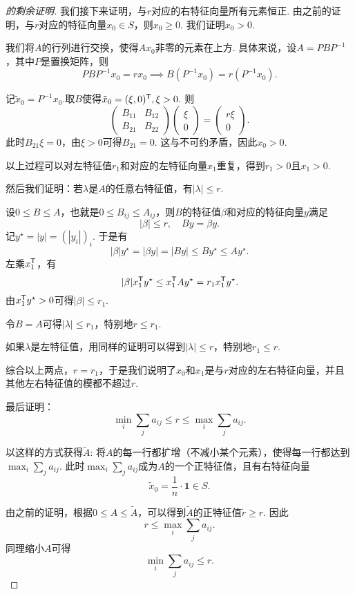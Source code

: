 \begin{proof}[ 的剩余证明]
我们接下来证明，与$r$对应的右特征向量所有元素恒正. 由之前的证明，与$r$对应的特征向量$x_0\in S$，则$x_0\geq 0$. 我们证明$x_0>0$.

我们将$A$的行列进行交换，使得$Ax_0$非零的元素在上方. 具体来说，设$A = PBP^{-1}$，其中$P$是置换矩阵，则
\[PBP^{-1}x_0=rx_0\implies B(P^{-1}x_0)=r(P^{-1}x_0).\]

记$\tilde{x}_0 = P^{-1}x_0$.取$B$使得$\tilde{x}_0 = (\xi,0)^{\mathsf{T}}, \xi > 0$. 则
\[
\begin{pmatrix}
    B_{11} & B_{12}\\
    B_{21} & B_{22}
\end{pmatrix}
\begin{pmatrix}
    \xi\\
    0
\end{pmatrix}=
\begin{pmatrix}
    r\xi\\
    0
\end{pmatrix}.
\]
此时$B_{21}\xi=0$，由$\xi>0$可得$B_{21}=0$. 这与不可约矛盾，因此$x_0 > 0$.

以上过程可以对左特征值$r_1$和对应的左特征向量$x_1$重复，得到$r_1>0$且$x_1>0$.

然后我们证明：若$\lambda$是$A$的任意右特征值，有$|\lambda|\leq r$. 

设$0\leq B\leq A$，也就是$0\leq B_{ij}\leq A_{ij}$，则$B$的特征值$\beta$和对应的特征向量$y$满足
\[|\beta|\leq r,\quad By=\beta y.\]
记$y^\star = |y|=(|y_i|)_i$. 于是有
\[|\beta|y^\star = |\beta y| = |By| \leq By^\star\leq Ay^\star.\]
左乘$x_1^{\mathsf{T}}$，有
\[|\beta|x_1^{\mathsf{T}} y^\star \leq x_1^{\mathsf{T}} Ay^\star = r_1x_1^{\mathsf{T}} y^\star.\]
由$x_1^{\mathsf{T}} y^\star>0$可得$|\beta|\leq r_1$. 

令$B=A$可得$|\lambda|\leq r_1$，特别地$r\leq r_1$. 

如果$\lambda$是左特征值，用同样的证明可以得到$|\lambda|\leq r$，特别地$r_1\leq r$. 

综合以上两点，$r=r_1$，于是我们说明了$x_0$和$x_1$是与$r$对应的左右特征向量，并且其他左右特征值的模都不超过$r$. 

最后证明：
\[\min_i\sum_j a_{ij}\leq r\leq \max_i\sum_j a_{ij}.\]

以这样的方式获得$\tilde A$: 将$A$的每一行都扩增（不减小某个元素），使得每一行都达到$\max_i\sum_j a_{ij}$. 此时$\max_i\sum_j a_{ij}$成为$A$的一个正特征值，且有右特征向量
\[\tilde{x}_0=\frac 1n\cdot\mathbf{1}\in S.\] 

由之前的证明，根据$0\leq A\leq \tilde A$，可以得到$\tilde A$的正特征值$\tilde r\geq r$. 因此
\[r \leq \max_i\sum_j a_{ij}.\]
同理缩小$A$可得
\[\min_i\sum_j a_{ij}\leq r.\]
\end{proof}


